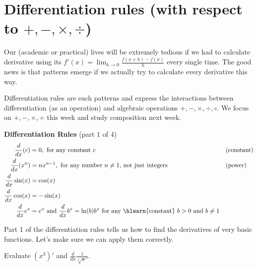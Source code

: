 \documentclass[../main.tex]{subfiles}
\begin{document}
 \section{Differentiation rules (with respect to \texorpdfstring{\(+,-,\times,\div\)}{+, -, •, ÷})}
  Our (academic or practical) lives will be extremely tedious if we had to calculate derivative using its \(f'(x) = \lim_{h \to 0} {\textstyle\frac{f(x+h) - f(x)}{h}}\) every single time.  The good news is that patterns emerge if we actually try to calculate every derivative this way. 

  Differentiation rules are such patterns and express the interactions between differentiation (as an operation) and algebraic operations \(+, -, \times, \div, \circ\). We focus on \(+, -, \times, \div\) this week and study composition next week.

  \begin{mdframed}[style=simple] \label{thm:diff-rules-1}
    \textbf{Differentiation Rules} \hfill {\footnotesize (part \(1\) of \(4\))}
    \begin{align*}
      \frac{d}{dx} (c)
    &= 0, \text{ for any constant \(c\)}
    && \text{(constant)} \\
    \frac{d}{dx} (x^{n})
    &= n x^{n-1}, \text{ for any number \(n \ne 1\), not just integers} 
    && \text{(power)} \\
    \frac{d}{dx} \sin(x)
    &= \cos(x) \\
    \frac{d}{dx} \cos(x)
    &= -\sin(x) \\
      \frac{d}{dx} e^{x} &= e^{x} \text{ and } \frac{d}{dx}b^{x} = \ln(b)b^{x} \text{ for any \hlwarn{constant} } b > 0 \text{ and } b \ne 1
    \end{align*}
  \end{mdframed}

  Part 1 of the differentiation rules tells us how to find the derivatives of very basic functions. Let's make sure we can apply them correctly.

  \begin{example}
    Evaluate \((x^{3})'\) and \(\frac{d}{dx}\frac{1}{\sqrt[3]{x}^{5}}\).

  \end{example}

\end{document}

